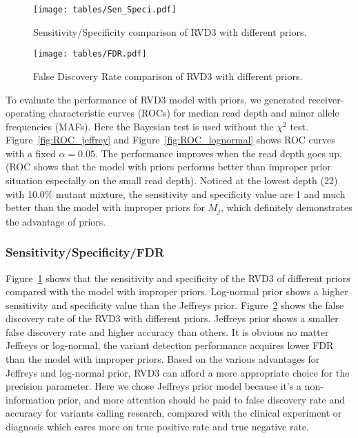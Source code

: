 \documentclass[11pt,reqno]{amsart}
\begin{document}
\begin{figure}[htbp]
\begin{center}
\texttt{[image: tables/Sen\_Speci.pdf]}
\caption{Sensitivity/Specificity comparison of RVD3 with different priors.}
\label{tbl:SS}
\end{center}
\end{figure}

\begin{figure}[htbp]
\begin{center}
\texttt{[image: tables/FDR.pdf]}
\caption{False Discovery Rate comparison of RVD3 with different priors.}
\label{tbl:FDR}
\end{center}
\end{figure}

To evaluate the performance of RVD3 model with priors, we generated receiver-operating characteristic curves (ROCs) for median read depth and minor allele frequencies (MAFs). Here the Bayesian test is used without the $\chi^2$ test. Figure~\ref{fig:ROC_jeffrey} and Figure~\ref{fig:ROC_lognormal} shows ROC curves with a fixed $\alpha=0.05$. The performance improves when the read depth goes up. (ROC shows that the model with priors performs better than improper prior situation especially on the small read depth). Noticed at the lowest depth (22) with 10.0\% mutant mixture, the sensitivity and specificity value are 1 and much better than the model with improper priors for $M_j$, which definitely demonstrates the advantage of priors.

\subsubsection{Sensitivity/Specificity/FDR}

Figure~\ref{tbl:SS} shows that the sensitivity and specificity of the RVD3 of different priors compared with the model with improper priors. Log-normal prior shows a higher sensitivity and specificity value than the Jeffreys prior.
Figure~\ref{tbl:FDR} shows the false discovery rate of the RVD3 with different priors. Jeffreys prior shows a smaller false discovery rate and higher accuracy than others. It is obvious no matter Jeffreys or log-normal, the variant detection performance acquires lower FDR than the model with improper priors. Based on the various advantages for Jeffreys and log-normal prior, RVD3 can afford a more appropriate choice for the precision parameter. Here we chose Jeffreys prior model because it's a non-information prior, and more attention should be paid to false discovery rate and accuracy for variants calling research, compared with the clinical experiment or diagnosis which cares more on true positive rate and true negative rate.
\end{document}
